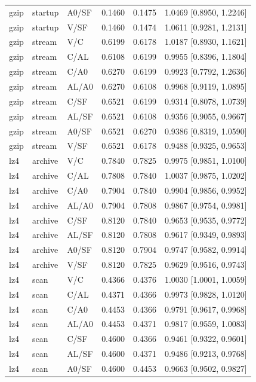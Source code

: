 \begin{longtable}{lllrrl}
gzip & startup & A0/SF & 0.1460 & 0.1475 & 1.0469 [0.8950, 1.2246] \\
gzip & startup & V/SF & 0.1460 & 0.1474 & 1.0611 [0.9281, 1.2131] \\
gzip & stream & V/C & 0.6199 & 0.6178 & 1.0187 [0.8930, 1.1621] \\
gzip & stream & C/AL & 0.6108 & 0.6199 & 0.9955 [0.8396, 1.1804] \\
gzip & stream & C/A0 & 0.6270 & 0.6199 & 0.9923 [0.7792, 1.2636] \\
gzip & stream & AL/A0 & 0.6270 & 0.6108 & 0.9968 [0.9119, 1.0895] \\
gzip & stream & C/SF & 0.6521 & 0.6199 & 0.9314 [0.8078, 1.0739] \\
gzip & stream & AL/SF & 0.6521 & 0.6108 & 0.9356 [0.9055, 0.9667] \\
gzip & stream & A0/SF & 0.6521 & 0.6270 & 0.9386 [0.8319, 1.0590] \\
gzip & stream & V/SF & 0.6521 & 0.6178 & 0.9488 [0.9325, 0.9653] \\
lz4 & archive & V/C & 0.7840 & 0.7825 & 0.9975 [0.9851, 1.0100] \\
lz4 & archive & C/AL & 0.7808 & 0.7840 & 1.0037 [0.9875, 1.0202] \\
lz4 & archive & C/A0 & 0.7904 & 0.7840 & 0.9904 [0.9856, 0.9952] \\
lz4 & archive & AL/A0 & 0.7904 & 0.7808 & 0.9867 [0.9754, 0.9981] \\
lz4 & archive & C/SF & 0.8120 & 0.7840 & 0.9653 [0.9535, 0.9772] \\
lz4 & archive & AL/SF & 0.8120 & 0.7808 & 0.9617 [0.9349, 0.9893] \\
lz4 & archive & A0/SF & 0.8120 & 0.7904 & 0.9747 [0.9582, 0.9914] \\
lz4 & archive & V/SF & 0.8120 & 0.7825 & 0.9629 [0.9516, 0.9743] \\
lz4 & scan & V/C & 0.4366 & 0.4376 & 1.0030 [1.0001, 1.0059] \\
lz4 & scan & C/AL & 0.4371 & 0.4366 & 0.9973 [0.9828, 1.0120] \\
lz4 & scan & C/A0 & 0.4453 & 0.4366 & 0.9791 [0.9617, 0.9968] \\
lz4 & scan & AL/A0 & 0.4453 & 0.4371 & 0.9817 [0.9559, 1.0083] \\
lz4 & scan & C/SF & 0.4600 & 0.4366 & 0.9461 [0.9322, 0.9601] \\
lz4 & scan & AL/SF & 0.4600 & 0.4371 & 0.9486 [0.9213, 0.9768] \\
lz4 & scan & A0/SF & 0.4600 & 0.4453 & 0.9663 [0.9502, 0.9827] \\

\end{longtable}
